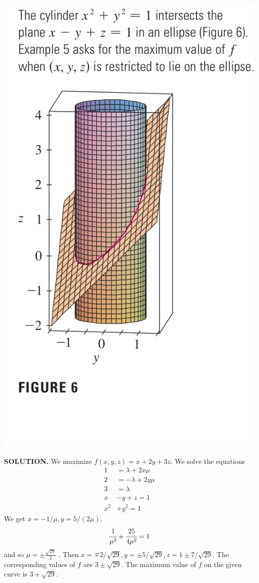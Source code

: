 \documentclass{article}
\begin{document}
\begin{minipage}[]{0.3\linewidth}
  \includegraphics[width = 4.3 cm]{./images/2constraints.png}
  
\end{minipage}
\begin{minipage}[]{0.67\linewidth}
{\selectfont \textbf{\textcolor{blue5}{SOLUTION.}}} 
We maximize $f(x,y,z) = x + 2y + 3z $. We solve the equations 
\begin{equation*}
  \begin{split}
    1 & = \lambda + 2x \mu \\
    2 & = - \lambda + 2y \mu \\ 
    3 &  = \lambda \\
    x & - y + z = 1 \\
    x^2 &  + y^2 = 1 
  \end{split}
\end{equation*}
We get $x = -1/\mu , y = 5 / (2 \mu  )$. 
\[\cfrac{1 }{\mu ^2 } + \cfrac{25 }{4 \mu ^2 } = 1 \]
and so $\mu = \pm \frac{\sqrt{29} }{2 }$  . Then $x = \mp 2/ \sqrt{29 }, y = \pm 5 / \sqrt{29 }, z = 1 \pm 7/ \sqrt{29 }  $. The corresponding values of $f $ are $3 \pm \sqrt{29 }$. The maximum value of $f$ on the given curve is $3 + \sqrt{29 }$.
  
\end{minipage}
\end{document}
